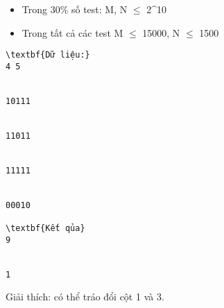 \begin{itemize}
	\item     Trong 30\% số test: M, N  $\le$  2^10   
	\item     Trong tất cả các test M  $\le$  15000, N  $\le$  1500   
\end{itemize}
\begin{verbatim}
\textbf{Dữ liệu:}
4 5


10111


11011


11111


00010

\textbf{Kết qủa}
9


1
\end{verbatim}

   Giải thích: có thể tráo đổi cột 1 và 3.